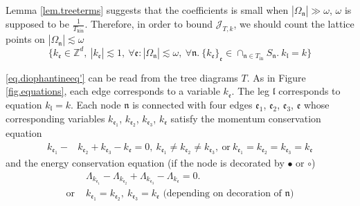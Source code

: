 Lemma \ref{lem.treeterms} suggests that the coefficients is small when $|\Omega_{\mathfrak{n}}|\gg \omega$, $\omega$ is supposed to be $\frac{1}{T_{\text{kin}}}$. Therefore, in order to bound $\mathcal{J}_{T,k}$, we should count the lattice points on $|\Omega_{\mathfrak{n}}|\lesssim \omega$
\begin{equation}\label{eq.diophantineeq'}
    \{k_{\mathfrak{e}}\in \mathbb{Z}^d,\ |k_{\mathfrak{e}}|\lesssim 1,\ \forall \mathfrak{e}: |\Omega_{\mathfrak{n}}|\lesssim \omega,\ \forall \mathfrak{n}. \ \{k_{\mathfrak{e}}\}_{\mathfrak{e}}\in \cap_{\mathfrak{n}\in T_{\text{in}}} S_{\mathfrak{n}}.\ k_{\mathfrak{l}}=k\}
\end{equation}


\eqref{eq.diophantineeq'} can be read from the tree diagrams $T$. As in Figure \ref{fig.equations}, each edge corresponds to a variable $k_{\mathfrak{e}}$. The leg $\mathfrak{l}$ corresponds to equation $k_{\mathfrak{l}}=k$. Each node $\mathfrak{n}$ is connected with four edges $\mathfrak{e}_1$, $\mathfrak{e}_2$, $\mathfrak{e}_3$, $\mathfrak{e}$ whose corresponding variables $k_{\mathfrak{e}_1}$, $k_{\mathfrak{e}_2}$, $k_{\mathfrak{e}_3}$, $k_{\mathfrak{e}}$ satisfy the momentum conservation equation
\begin{equation}
\begin{split}
k_{\mathfrak{e}_1}-&k_{\mathfrak{e}_2}+k_{\mathfrak{e}_3}-k_{\mathfrak{e}}=0,\ k_{\mathfrak{e}_1}\ne k_{\mathfrak{e}_2}\ne k_{\mathfrak{e}_3},\ \text{or}\ k_{\mathfrak{e}_1}= k_{\mathfrak{e}_2}= k_{\mathfrak{e}_3}=k_{\mathfrak{e}}
\end{split}
\end{equation}
and the energy conservation equation (if the node is decorated by $\bullet$ or $\circ$)
\begin{equation}
    \begin{split}
        &\Lambda_{k_{\mathfrak{e}_1}}-\Lambda_{k_{\mathfrak{e}_2}}+\Lambda_{k_{\mathfrak{e}_3}}-\Lambda_{k_{\mathfrak{e}}} =0.
        \\
        \text{or } &\text{$k_{\mathfrak{e}_1}=k_{\mathfrak{e}_2},\ k_{\mathfrak{e}_3}=k_{\mathfrak{e}}$ (depending on decoration of $\mathfrak{n}$)}     
    \end{split}
\end{equation}



